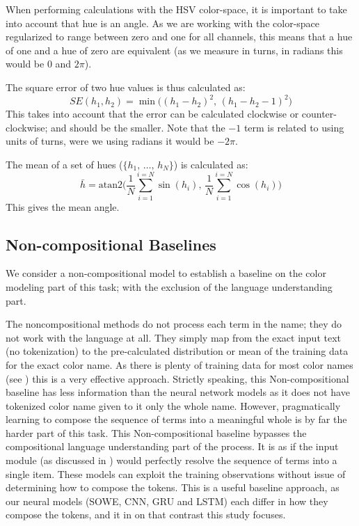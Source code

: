 \documentclass[]{clv3}
\newcommand{\empmodel}{Non-compositional baseline} %
\begin{document}
When performing calculations with the HSV color-space, it is important to take into account that hue is an angle.
As we are working with the color-space regularized to range between zero and one for all channels,
this means that a hue of one and a hue of zero are equivalent (as we measure in turns, in radians this would be $0$ and $2\pi$).

The square error of two hue values is thus calculated as:
\begin{equation}
SE(h_1, h_2) = \min \big( \left(h_1 - h_2 \right)^2, \, \left(h_1 - h_2 -1 \right)^2  \big)
\end{equation}
This takes into account that the error can be calculated clockwise or counter-clockwise; and should be the smaller.
Note that the $-1$ term is related to using units of turns, were we using radians it would be $-2\pi$.


The mean of a set of hues ($\lbrace h_1,\,\ldots,\,h_N \rbrace$) is calculated as:
\begin{equation}
\bar h = \mathrm{atan2} \Bigg(%
	\frac{1}{N} \sum_{i=1}^{i=N} \sin (h_i), \,  %
	\frac{1}{N} \sum_{i=1}^{i=N} \cos (h_i)%
\Bigg)%
\end{equation}
This gives the mean angle.



\subsection{Non-compositional Baselines}
We consider a non-compositional model to establish a baseline on the color modeling part of this task; with the exclusion of the language understanding part.

The noncompositional methods do not process each term in the name; they do not work with the language at all.
They simply map from the exact input text (no tokenization) to the pre-calculated distribution or mean of the training data for the exact color name.
As there is plenty of training data for most color names (see ) this is a very effective approach.
%
Strictly speaking, this \empmodel{} has less information than the neural network models
as it does not have tokenized color name given to it only the whole name.
However, pragmatically learning to compose the sequence of terms into a meaningful whole is by far  the harder part of this task.
%
This \empmodel{} bypasses the compositional language understanding part of the process.
It is as if the input module (as discussed in ) would perfectly resolve the sequence of terms into a single item.
%
These models can exploit the training observations without issue of determining how to compose the tokens.
This is a useful baseline approach, as our neural models (SOWE, CNN, GRU and LSTM)
each differ in how they compose the tokens, and it in on that contrast this study focuses.
\end{document}
